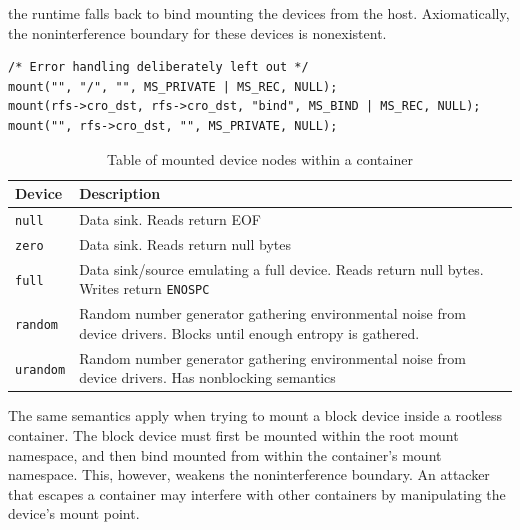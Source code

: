 the runtime falls back to bind mounting the devices from the host. 
Axiomatically, the noninterference boundary for these devices is nonexistent. 
\begin{lstlisting}[style=c-code-snippets, label={code:implementation/namespaces/mount}, caption={Remounting the original root filesystem to disable mount propagation events and bind mounting the container's root filesystem onto itself.}]
/* Error handling deliberately left out */
mount("", "/", "", MS_PRIVATE | MS_REC, NULL);
mount(rfs->cro_dst, rfs->cro_dst, "bind", MS_BIND | MS_REC, NULL);
mount("", rfs->cro_dst, "", MS_PRIVATE, NULL);
\end{lstlisting}

\begin{table}[h!]
    \centering
    \begin{tabular}{ |m{4cm}|m{20em}| }
        \hline
        Device & Description \\
        \hline
        \verb|null| & Data sink. Reads return EOF \\
        \hline 
        \verb|zero| & Data sink. Reads return null bytes \\
        \hline
        \verb|full| & Data sink/source emulating a full device. Reads return null bytes. Writes return \verb|ENOSPC| \\
        \hline
        \verb|random| & Random number generator gathering environmental noise from device drivers. Blocks until enough entropy is gathered. \\
        \hline
        \verb|urandom| & Random number generator gathering environmental noise from device drivers. Has nonblocking semantics \\
        \hline
    \end{tabular}
    \caption{Table of mounted device nodes within a container}
    \label{table:implementation/runtime/devices}
\end{table}

The same semantics apply when trying to mount a block device inside a 
rootless container. The block device must first be mounted within the root mount namespace, and 
then bind mounted from within the container's mount namespace. This, however, weakens the 
noninterference boundary. An attacker that escapes a container may interfere with other containers
by manipulating the device's mount point.

